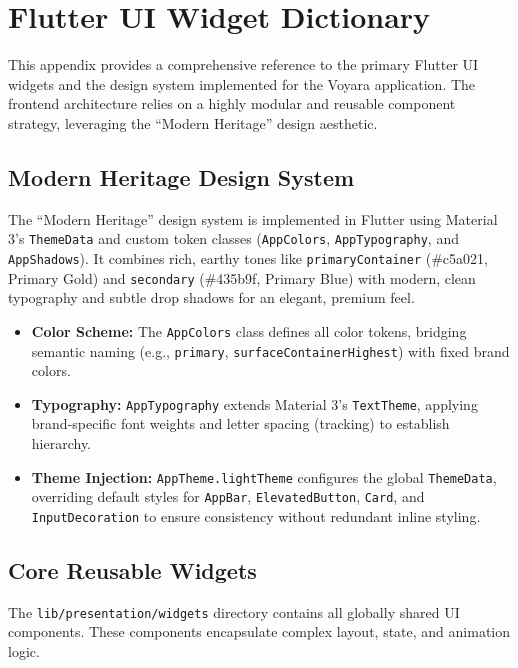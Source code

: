 \chapter{Flutter UI Widget Dictionary}
\label{ch:flutter-ui-widget-dictionary}

This appendix provides a comprehensive reference to the primary Flutter UI widgets and the design system implemented for the Voyara application. The frontend architecture relies on a highly modular and reusable component strategy, leveraging the ``Modern Heritage'' design aesthetic.

\section{Modern Heritage Design System}
\label{sec:modern-heritage-design-system}

The ``Modern Heritage'' design system is implemented in Flutter using Material 3's \texttt{ThemeData} and custom token classes (\texttt{AppColors}, \texttt{AppTypography}, and \texttt{AppShadows}). It combines rich, earthy tones like \texttt{primaryContainer} (\#c5a021, Primary Gold) and \texttt{secondary} (\#435b9f, Primary Blue) with modern, clean typography and subtle drop shadows for an elegant, premium feel.

\begin{itemize}
    \item \textbf{Color Scheme:} The \texttt{AppColors} class defines all color tokens, bridging semantic naming (e.g., \texttt{primary}, \texttt{surfaceContainerHighest}) with fixed brand colors.
    \item \textbf{Typography:} \texttt{AppTypography} extends Material 3's \texttt{TextTheme}, applying brand-specific font weights and letter spacing (tracking) to establish hierarchy.
    \item \textbf{Theme Injection:} \texttt{AppTheme.lightTheme} configures the global \texttt{ThemeData}, overriding default styles for \texttt{AppBar}, \texttt{ElevatedButton}, \texttt{Card}, and \texttt{InputDecoration} to ensure consistency without redundant inline styling.
\end{itemize}

\section{Core Reusable Widgets}
\label{sec:core-reusable-widgets}

The \texttt{lib/presentation/widgets} directory contains all globally shared UI components. These components encapsulate complex layout, state, and animation logic.

